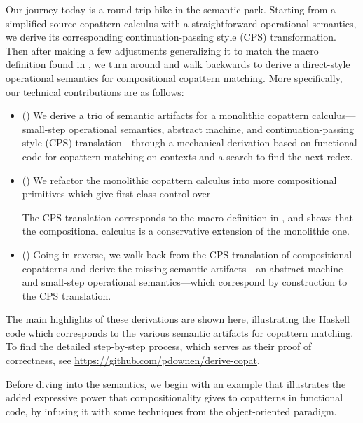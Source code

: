\documentclass[sigplan,screen]{acmart}
\begin{document}
Our journey today is a round-trip hike in the semantic park.  Starting from a
simplified source copattern calculus with a straightforward operational
semantics, we derive its corresponding continuation-passing style (CPS)
transformation.  Then after making a few adjustments generalizing it to match
the macro definition found in \cite{CoScheme}, we turn around and walk backwards
to derive a direct-style operational semantics for compositional copattern
matching.  More specifically, our technical contributions are as follows:
\begin{itemize}
\item () We derive a trio of semantic artifacts for a
  monolithic copattern calculus---small-step operational semantics, abstract
  machine, and continuation-passing style (CPS) translation---through a
  mechanical derivation based on functional code for copattern matching on
  contexts and a search to find the next redex.
\item () We refactor the monolithic copattern calculus into
  more compositional primitives which give first-class control over
  The CPS translation corresponds to the macro definition in \cite{CoScheme},
  and shows that the compositional calculus is a conservative extension of the
  monolithic one.
\item () Going in reverse, we walk back from the CPS
  translation of compositional copatterns and derive the missing semantic
  artifacts---an abstract machine and small-step operational semantics---which
  correspond by construction to the CPS translation.
\end{itemize}
The main highlights of these derivations are shown here, illustrating the
Haskell code which corresponds to the various semantic artifacts for copattern
matching.  To find the detailed step-by-step process, which serves as their
proof of correctness, see \url{https://github.com/pdownen/derive-copat}.

Before diving into the semantics, we begin with an example that illustrates the
added expressive power that compositionality gives to copatterns in functional
code, by infusing it with some techniques from the object-oriented paradigm.
\end{document}
